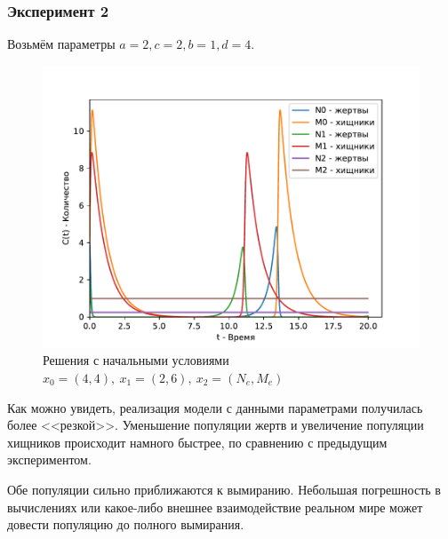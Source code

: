         \subsubsection{Эксперимент 2}
        Возьмём параметры $a = 2, c = 2, b = 1, d = 4$.
        \begin{figure}[H]
            \centering
            \includegraphics[width=15cm]{pictures/population2.pdf}
            \caption{Решения с начальными условиями $x_0=(4,4), ~ x_1 = (2,6), ~ x_2 = (N_e, M_e)$}
        \end{figure}
        Как можно увидеть, реализация модели с данными параметрами получилась более <<резкой>>. Уменьшение популяции жертв и увеличение популяции хищников происходит намного быстрее, по сравнению с предыдущим экспериментом.

        Обе популяции сильно приближаются к вымиранию. Небольшая погрешность в вычислениях или какое-либо внешнее взаимодействие реальном мире может довести популяцию до полного вымирания.

